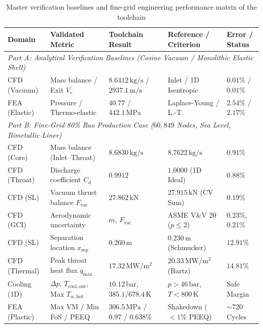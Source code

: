 \documentclass[11pt,a4paper]{article}
\begin{document}
\begin{table}[H]
\centering
\caption{Master verification baselines and fine-grid engineering performance matrix of the toolchain}
\label{tab:master_validation}
\vspace{0.2cm}
\footnotesize
\setlength{\tabcolsep}{4pt}
\begin{tabular}{lllll}
\toprule
\textbf{Domain} & \textbf{Validated Metric} & \textbf{Toolchain Result} & \textbf{Reference / Criterion} & \textbf{Error / Status} \\
\midrule
\multicolumn{5}{l}{\textit{Part A: Analytical Verification Baselines (Cosine Vacuum / Monolithic Elastic Shell)}} \\
CFD (Vacuum) & Mass balance / Exit $V_e$ & $8.6412\,\mathrm{kg/s}$ / $2937.1\,\mathrm{m/s}$ & Inlet / 1D Isentropic & $0.01\%$ / $0.01\%$ \\
FEA (Elastic) & Pressure / Thermo-elastic & $40.77$ / $442.1\,\mathrm{MPa}$ & Laplace-Young / L.-T. & $2.54\%$ / $2.17\%$ \\
\midrule
\multicolumn{5}{l}{\textit{Part B: Fine-Grid 80\% Rao Production Case ($60{,}849$ Nodes, Sea Level, Bimetallic Liner)}} \\
CFD (Core) & Mass balance (Inlet--Throat) & $8.6830\,\mathrm{kg/s}$ & $8.7622\,\mathrm{kg/s}$ & $0.91\%$ \\
CFD (Throat) & Discharge coefficient $C_d$ & $0.9912$ & $1.0000$ (1D Ideal) & $0.88\%$ \\
CFD (SL) & Vacuum thrust balance $F_{\mathrm{vac}}$ & $27.862\,\mathrm{kN}$ & $27.915\,\mathrm{kN}$ (CV Sum) & $0.19\%$ \\
CFD (GCI) & Aerodynamic uncertainty & $\dot{m}$, $F_{\mathrm{vac}}$ & ASME V\&V 20 ($p \le 2$) & $0.23\%$, $0.21\%$ \\
CFD (SL) & Separation location $x_{\mathrm{sep}}$ & $0.260\,\mathrm{m}$ & $0.230\,\mathrm{m}$ (Schmucker) & $12.91\%$ \\
CFD (Thermal) & Peak throat heat flux $q_{\max}$ & $17.32\,\mathrm{MW/m^2}$ & $20.33\,\mathrm{MW/m^2}$ (Bartz) & $14.81\%$ \\
Cooling (1D) & $\Delta p$, $T_{\mathrm{cool,out}}$, Max $T_{w,\mathrm{hot}}$ & $10.12\,\mathrm{bar}$, $385.1 / 678.4\,\mathrm{K}$ & $p > 46\,\mathrm{bar}$, $T < 800\,\mathrm{K}$ & Safe Margin \\
FEA (Plastic) & Max VM / Min FoS / PEEQ & $306.5\,\mathrm{MPa}$ / $0.97$ / $0.638\%$ & Shakedown ($<1\%$ PEEQ) & $\sim 720$ Cycles \\
\bottomrule
\end{tabular}
\end{table}
\end{document}
